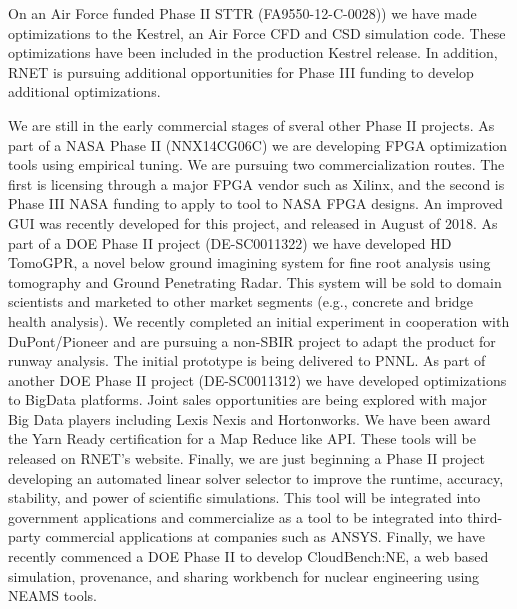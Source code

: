 On an Air Force funded Phase II STTR (FA9550-12-C-0028)) we
have made optimizations to the Kestrel, an Air Force CFD and CSD
simulation code. These optimizations have been included in the
production Kestrel release. In addition, RNET is pursuing additional
opportunities for Phase III funding to develop additional
optimizations.


We are still in the early commercial stages of sveral other Phase II
projects. As part of a NASA Phase II (NNX14CG06C) we are developing
FPGA optimization tools using empirical tuning. We are pursuing two
commercialization routes. The first is licensing through a major FPGA
vendor such as Xilinx, and the second is Phase III NASA funding to
apply to tool to NASA FPGA designs. An improved GUI was recently developed for this project, and released in August of 2018. As part of a DOE Phase II project
(DE-SC0011322) we have developed HD TomoGPR, a novel below ground
imagining system for fine root analysis using tomography and Ground
Penetrating Radar. This system will be sold to domain scientists and
marketed to other market segments (e.g., concrete and bridge health
analysis). We recently completed an initial experiment in cooperation
with DuPont/Pioneer and are pursuing a non-SBIR project to adapt the
product for runway analysis. The initial prototype is being delivered to PNNL. As part of another DOE Phase II project
(DE-SC0011312) we have developed optimizations to BigData
platforms. Joint sales opportunities are being explored with major Big
Data players including Lexis Nexis and Hortonworks. We have 
been award the Yarn Ready certification for a Map Reduce like API. These tools will be released on RNET's website. Finally, we
are just beginning a Phase II project developing an automated linear
solver selector to improve the runtime, accuracy, stability, and power
of scientific simulations. This tool will be integrated into
government applications and commercialize as a tool to be integrated
into third-party commercial applications at companies such as ANSYS. Finally, we have recently commenced a DOE Phase II to develop CloudBench:NE, a web based simulation, provenance, and sharing workbench for nuclear engineering using NEAMS tools.
